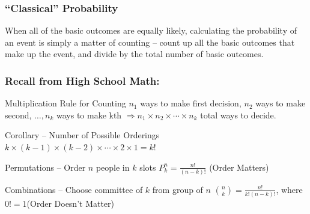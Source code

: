 \documentclass{beamer}
\begin{document}
\begin{frame}

\frametitle{``Classical'' Probability}

When all of the basic outcomes are equally likely, calculating the probability of an event is simply a matter of counting -- count up all the basic outcomes that make up the event, and divide by the total number of basic outcomes.

\end{frame}
\begin{frame}
\frametitle{Recall from High School Math:}

\begin{block}{Multiplication Rule for Counting}
$n_1$ ways to make first decision, $n_2$ ways to make second, $\hdots, n_k$ ways to make kth $\Rightarrow n_1 \times n_2 \times \cdots \times n_k$ total ways to decide. \end{block}
\begin{block}{Corollary -- Number of Possible Orderings}
$k \times(k-1)\times (k-2) \times \cdots\times  2 \times 1 = k!$
\end{block}

\begin{block}{Permutations -- Order $n$ people in $k$ slots}
$P_k^n = \frac{n!}{(n-k)!}$ \hfill \alert{(Order Matters)}\end{block}

\begin{block}{Combinations -- Choose committee of $k$ from group of $n$}
${n \choose k} = \frac{n!}{k! (n-k)!}$, where $0! = 1$\hfill \alert{(Order Doesn't Matter)}\end{block}

\end{frame}
\end{document}
